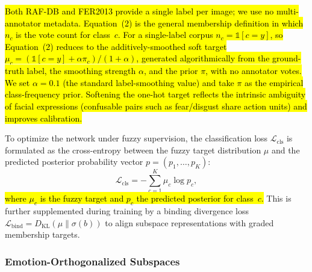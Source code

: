 \documentclass[algorithms,article,submit,moreauthors]{Definitions/mdpi}
\newcommand{\rev}[1]{\hl{#1}}
\begin{document}
\rev{Both RAF-DB and FER2013 provide a single label per image; we use no
multi-annotator metadata. Equation~(2) is the general membership definition in
which \mbox{$n_c$} is the vote count for class~\mbox{$c$}. For a single-label
corpus \mbox{$n_c=\mathbb{1}[c=y]$}, so Equation~(2) reduces to the
additively-smoothed soft target \mbox{$\mu_c=(\mathbb{1}[c=y]+\alpha\pi_c)/(1+\alpha)$},
generated algorithmically from the ground-truth label, the smoothing strength
\mbox{$\alpha$}, and the prior \mbox{$\pi$}, with no annotator votes. We set
\mbox{$\alpha=0.1$} (the standard label-smoothing value) and take \mbox{$\pi$} as
the empirical class-frequency prior. Softening the one-hot target reflects the
intrinsic ambiguity of facial expressions (confusable pairs such as fear/disgust
share action units) and improves calibration.}


To optimize the network under fuzzy supervision, the classification loss $\mathcal{L}_{\text{cls}}$ is formulated as the cross-entropy between the fuzzy target distribution $\mu$ and the predicted posterior probability vector $p = (p_1, \dots, p_K)$:
\begin{equation}
\mathcal{L}_{\text{cls}} = -\sum_{c=1}^{K} \mu_c \log p_c,
\label{eq:fuzzy_loss}
\end{equation}
\rev{where \mbox{$\mu_c$} is the fuzzy target and \mbox{$p_c$} the predicted posterior for class~\mbox{$c$}.} This is further supplemented during training by a binding divergence loss $\mathcal{L}_{\text{bind}} = D_{\text{KL}}(\mu \parallel \sigma(b))$ to align subspace representations with graded membership targets.

\subsubsection{Emotion-Orthogonalized Subspaces}
\end{document}
